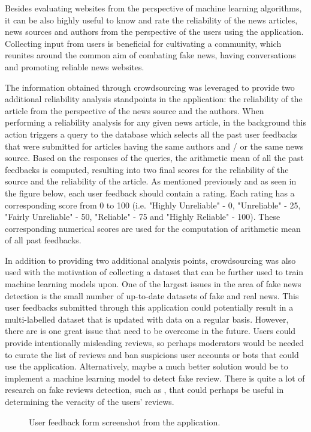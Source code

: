 Besides evaluating websites from the perspective of machine learning algorithms, it can be also highly useful to know and rate the reliability of the news articles, news sources and authors from the perspective of the users using the application. Collecting input from users is beneficial for cultivating a community, which reunites around the common aim of combating fake news, having conversations and promoting reliable news websites.

The information obtained through crowdsourcing was leveraged to provide two additional reliability analysis standpoints in the application: the reliability of the article from the perspective of the news source and the authors. When performing a reliability analysis for any given news article, in the background this action triggers a query to the database which selects all the past user feedbacks that were submitted for articles having the same authors and / or the same news source. Based on the responses of the queries, the arithmetic mean of all the past feedbacks is computed, resulting into two final scores for the reliability of the source and the reliability of the article. As mentioned previously and as seen in the figure below, each user feedback should contain a rating. Each rating has a corresponding score from 0 to 100 (i.e. "Highly Unreliable" - 0, "Unreliable" - 25, "Fairly Unreliable" - 50, "Reliable" - 75 and "Highly Reliable" - 100). These corresponding numerical scores are used for the computation of arithmetic mean of all past feedbacks.

In addition to providing two additional analysis points, crowdsourcing was also used with the motivation of collecting a dataset that can be further used to train machine learning models upon. One of the largest issues in the area of fake news detection is the small number of up-to-date datasets of fake and real news. This user feedbacks submitted through this application could potentially result in a multi-labelled dataset that is updated with data on a regular basis. However, there are is one great issue that need to be overcome in the future. Users could provide intentionally misleading reviews, so perhaps moderators would be needed to curate the list of reviews and ban suspicions user accounts or bots that could use the application. Alternatively, maybe a much better solution would be to implement a machine learning model to detect fake review. There is quite a lot of research on fake reviews detection, such as \cite{a11}\cite{a12}, that could perhaps be useful in determining the veracity of the users' reviews.

\begin{figure}[h]
  \centering
  \caption{User feedback form screenshot from the application.}
\end{figure}